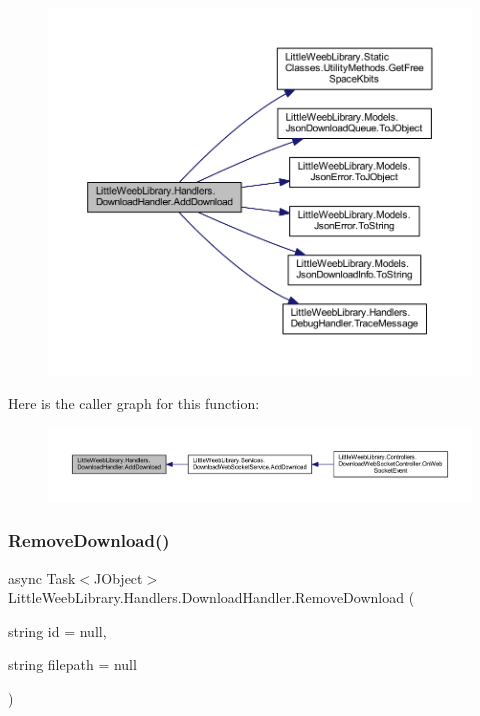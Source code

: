 \begin{figure}[H]
\begin{center}
\leavevmode
\includegraphics[width=350pt]{class_little_weeb_library_1_1_handlers_1_1_download_handler_ad28cb47c19cac5e761ceff86ea021a02_cgraph}
\end{center}
\end{figure}
Here is the caller graph for this function\+:\nopagebreak
\begin{figure}[H]
\begin{center}
\leavevmode
\includegraphics[width=350pt]{class_little_weeb_library_1_1_handlers_1_1_download_handler_ad28cb47c19cac5e761ceff86ea021a02_icgraph}
\end{center}
\end{figure}
\mbox{\label{class_little_weeb_library_1_1_handlers_1_1_download_handler_aac22841386d098daef366cbe05262187}} 
\subsubsection{\texorpdfstring{Remove\+Download()}{RemoveDownload()}}
{\footnotesize\ttfamily async Task$<$J\+Object$>$ Little\+Weeb\+Library.\+Handlers.\+Download\+Handler.\+Remove\+Download (\begin{DoxyParamCaption}\item[{string}]{id = {\ttfamily null},  }\item[{string}]{filepath = {\ttfamily null} }\end{DoxyParamCaption})}



